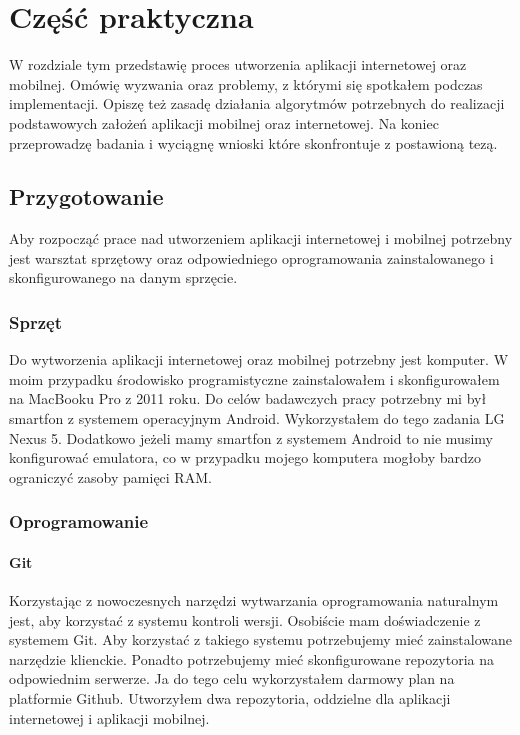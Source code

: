 \chapter{Część praktyczna}
W rozdziale tym przedstawię proces utworzenia aplikacji internetowej oraz mobilnej. Omówię wyzwania oraz problemy, z którymi się spotkałem podczas implementacji. Opiszę też zasadę działania algorytmów potrzebnych do realizacji podstawowych założeń aplikacji mobilnej oraz internetowej. Na koniec przeprowadzę badania i wyciągnę wnioski które skonfrontuje z postawioną tezą.

\section{Przygotowanie}
Aby rozpocząć prace nad utworzeniem aplikacji internetowej i mobilnej potrzebny jest warsztat sprzętowy oraz odpowiedniego oprogramowania zainstalowanego i skonfigurowanego na danym sprzęcie.

\subsection{Sprzęt}
Do wytworzenia aplikacji internetowej oraz mobilnej potrzebny jest komputer. W moim przypadku środowisko programistyczne zainstalowałem i skonfigurowałem na MacBooku Pro z 2011 roku. Do celów badawczych pracy potrzebny mi był smartfon z systemem operacyjnym Android. Wykorzystałem do tego zadania LG Nexus 5. Dodatkowo jeżeli mamy smartfon z systemem Android to nie musimy konfigurować emulatora, co w przypadku mojego komputera mogłoby bardzo ograniczyć zasoby pamięci RAM.

\subsection{Oprogramowanie}
\subsubsection{Git}
Korzystając z nowoczesnych narzędzi wytwarzania oprogramowania naturalnym jest, aby korzystać z systemu kontroli wersji. Osobiście mam doświadczenie z systemem Git. Aby korzystać z takiego systemu potrzebujemy mieć zainstalowane narzędzie klienckie. Ponadto potrzebujemy mieć skonfigurowane repozytoria na odpowiednim serwerze. Ja do tego celu wykorzystałem darmowy plan na platformie Github. Utworzyłem dwa repozytoria, oddzielne dla aplikacji internetowej i aplikacji mobilnej.

